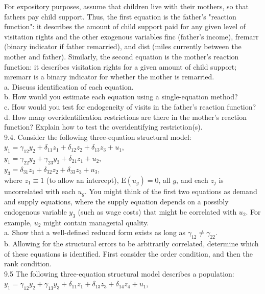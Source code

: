 \documentclass[10pt]{article}
\begin{document}
For expository purposes, assume that children live with their mothers, so that fathers pay child support. Thus, the first equation is the father's "reaction function": it describes the amount of child support paid for any given level of visitation rights and the other exogenous variables finc (father's income), fremarr (binary indicator if father remarried), and dist (miles currently between the mother and father). Similarly, the second equation is the mother's reaction function: it describes visitation rights for a given amount of child support; mremarr is a binary indicator for whether the mother is remarried.\\
a. Discuss identification of each equation.\\
b. How would you estimate each equation using a single-equation method?\\
c. How would you test for endogeneity of visits in the father's reaction function?\\
d. How many overidentification restrictions are there in the mother's reaction function? Explain how to test the overidentifying restriction(s).\\
9.4. Consider the following three-equation structural model:\\
$y_{1}=\gamma_{12} y_{2}+\delta_{11} z_{1}+\delta_{12} z_{2}+\delta_{13} z_{3}+u_{1}$,\\
$y_{1}=\gamma_{22} y_{2}+\gamma_{23} y_{3}+\delta_{21} z_{1}+u_{2}$,\\
$y_{3}=\delta_{31} z_{1}+\delta_{32} z_{2}+\delta_{33} z_{3}+u_{3}$,\\
where $z_{1} \equiv 1$ (to allow an intercept), $\mathrm{E}\left(u_{g}\right)=0$, all $g$, and each $z_{j}$ is uncorrelated with each $u_{g}$. You might think of the first two equations as demand and supply equations, where the supply equation depends on a possibly endogenous variable $y_{3}$ (such as wage costs) that might be correlated with $u_{2}$. For example, $u_{2}$ might contain managerial quality.\\
a. Show that a well-defined reduced form exists as long as $\gamma_{12} \neq \gamma_{22}$.\\
b. Allowing for the structural errors to be arbitrarily correlated, determine which of these equations is identified. First consider the order condition, and then the rank condition.\\
9.5 The following three-equation structural model describes a population:\\
$y_{1}=\gamma_{12} y_{2}+\gamma_{13} y_{3}+\delta_{11} z_{1}+\delta_{13} z_{3}+\delta_{14} z_{4}+u_{1}$,\\
\end{document}
